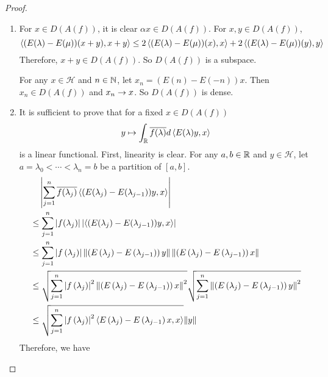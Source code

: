 \documentclass[a4paper,12pt]{article}
\begin{document}
\begin{proof}
    \begin{enumerate}[label=(\arabic{*})]
        \item For $x \in D(A(f))$, it is clear $\alpha x \in D(A(f))$. For $x,y \in D(A(f))$,
        \begin{equation*}
            \left\langle (E(\lambda)-E(\mu))(x+y),x+y \right\rangle \leq 2\left\langle (E(\lambda)-E(\mu))(x),x \right\rangle + 2\left\langle (E(\lambda)-E(\mu))(y),y \right\rangle
        \end{equation*}
        Therefore, $x + y \in D(A(f))$. So $D(A(f))$ is a subspace.

        For any $x \in \mathcal{H}$ and $n \in \mathbb{N}$, let $x_n = (E(n) - E(-n))x$. Then $x_n \in D(A(f))$ and $x_n \rightarrow x$. So $D(A(f))$ is dense.

        \item It is sufficient to prove that for a fixed $x \in D(A(f))$
        \begin{equation*}
            y \mapsto \int_{\mathbb{R}} \overline{f(\lambda)} d\left\langle E(\lambda)y,x \right\rangle
        \end{equation*}
        is a linear functional. First, linearity is clear. For any $a,b \in \mathbb{R}$ and $y \in \mathcal{H}$, let $a = \lambda_0 < \cdots < \lambda_n = b$ be a partition of $[a,b]$.
        \begin{equation*}
            \begin{aligned}
                &\quad\left\lvert\sum_{j=1}^n \overline{f(\lambda_j)} \left\langle (E(\lambda_j)-E(\lambda_{j-1}))y,x \right\rangle\right\lvert \\ 
                &\leq \sum_{j=1}^n \left\lvert f(\lambda_j)\right\lvert \left\lvert\left\langle (E(\lambda_j)-E(\lambda_{j-1}))y,x \right\rangle\right\lvert \\
                &\leq\sum_{j=1}^n\left|f\left(\lambda_j\right)\right|\left\|\left(E\left(\lambda_j\right)-E\left(\lambda_{j-1}\right)\right) y\right\|\left\|\left(E\left(\lambda_j\right)-E\left(\lambda_{j-1}\right)\right) x\right\| \\
                &\leq\sqrt{\sum_{j=1}^n\left|f\left(\lambda_j\right)\right|^2\left\|\left(E\left(\lambda_j\right)-E\left(\lambda_{j-1}\right)\right) x\right\|^2} \sqrt{\sum_{j=1}^n\left\|\left(E\left(\lambda_j\right)-E\left(\lambda_{j-1}\right)\right) y\right\|^2} \\
                &\leq \sqrt{\sum_{j=1}^n\left|f\left(\lambda_j\right)\right|^2 \left\langle E\left(\lambda_j\right)-E\left(\lambda_{j-1}\right) x, x \right\rangle}\|y\|
            \end{aligned}
        \end{equation*}
        Therefore, we have

\end{enumerate}
\end{proof}
\end{document}
